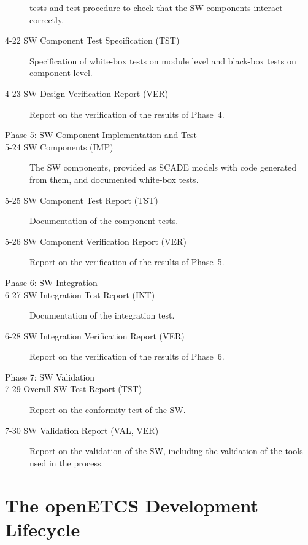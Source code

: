 \documentclass{template/openetcs_article}
\begin{document}
\begin{description}
  tests and test procedure to check that the SW components interact
  correctly.
\item[4-22 SW Component Test Specification (TST)] Specification of
  white-box tests on module level and black-box tests on component level.
\item[4-23 SW Design Verification Report (VER)] Report on the
  verification of the results of Phase~4.
\item[Phase 5: SW Component Implementation and Test] 
\item[5-24 SW Components (IMP)] The SW components, provided as SCADE models
  with code generated from them, and documented white-box tests.
\item[5-25 SW Component Test Report (TST)] Documentation of the component tests. 
\item[5-26 SW Component Verification Report (VER)] Report on the
  verification of the results of Phase~5.
\item[Phase 6: SW Integration] 
\item[6-27 SW Integration Test Report (INT)] Documentation of the
  integration test. 
\item[6-28 SW Integration Verification Report (VER)] Report on the
  verification of the results of Phase~6.
\item[Phase 7: SW Validation] 
\item[7-29 Overall SW Test Report (TST)] Report on the conformity test of
  the SW.
\item[7-30 SW Validation Report (VAL, VER)] Report on the validation of the
  SW, including the validation of the tools used in the process. 
\end{description}




\section{The openETCS Development Lifecycle}
\label{sec:devel-lifecycle}


\end{document}
